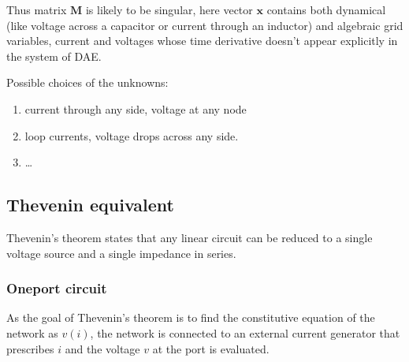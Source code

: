 \documentclass[letterpaper,10pt,english]{jupyterBook}
\begin{document}
\sphinxAtStartPar
Thus matrix \(\mathbf{M}\) is likely to be singular, here vector \(\mathbf{x}\) contains both dynamical (like voltage across a capacitor or current through an inductor) and algebraic grid variables, current and voltages whose time derivative doesn’t appear explicitly in the system of DAE.

\sphinxAtStartPar
{} Possible choices of the unknowns:
\begin{enumerate}
%
\item {} 
\sphinxAtStartPar
current through any side, voltage at any node

\item {} 
\sphinxAtStartPar
loop currents, voltage drops across any side.

\item {} 
\sphinxAtStartPar
… 

\end{enumerate}


\subsection{Thevenin equivalent}
\label{\detokenize{ch/electrical-engineering-networks-linear:thevenin-equivalent}}\label{\detokenize{ch/electrical-engineering-networks-linear:classical-electromagnetism-electrical-engineering-newtork-analysis-thevenin}}
\sphinxAtStartPar
{} Thevenin’s theorem states that any linear circuit can be reduced to a single voltage source and a single impedance in series.


\subsubsection{One\sphinxhyphen{}port circuit}
\label{\detokenize{ch/electrical-engineering-networks-linear:one-port-circuit}}\label{\detokenize{ch/electrical-engineering-networks-linear:classical-electromagnetism-electrical-engineering-newtork-analysis-thevenin-1-port}}
\sphinxAtStartPar
As the goal of Thevenin’s theorem is to find the constitutive equation of the network as \(v(i)\), the network is connected to an external current generator that prescribes \(i\) and the voltage \(v\) at the port is evaluated.
\end{document}
